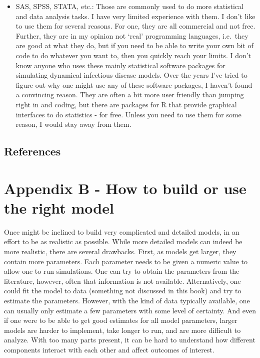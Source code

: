 \documentclass[
]{book}
\begin{document}
\begin{itemize}
\item
  SAS, SPSS, STATA, etc.: Those are commonly used to do more statistical and data analysis tasks. I have very limited experience with them. I don't like to use them for several reasons. For one, they are all commercial and not free. Further, they are in my opinion not `real' programming languages, i.e.~they are good at what they do, but if you need to be able to write your own bit of code to do whatever you want to, then you quickly reach your limits. I don't know anyone who uses these mainly statistical software packages for simulating dynamical infectious disease models. Over the years I've tried to figure out why one might use any of these software packages, I haven't found a convincing reason. They are often a bit more user friendly than jumping right in and coding, but there are packages for R that provide graphical interfaces to do statistics - for free. Unless you need to use them for some reason, I would stay away from them.
\end{itemize}

\hypertarget{references-19}{%
\section{References}\label{references-19}}

\hypertarget{modelcomplexity}{%
\chapter{Appendix B - How to build or use the right model}\label{modelcomplexity}}

Onee might be inclined to build very complicated and detailed models, in an effort to be as realistic as possible. While more detailed models can indeed be more realistic, there are several drawbacks. First, as models get larger, they contain more parameters. Each parameter needs to be given a numeric value to allow one to run simulations. One can try to obtain the parameters from the literature, however, often that information is not available. Alternatively, one could fit the model to data (something not discussed in this book) and try to estimate the parameters. However, with the kind of data typically available, one can usually only estimate a few parameters with some level of certainty. And even if one were to be able to get good estimates for all model parameters, larger models are harder to implement, take longer to run, and are more difficult to analyze. With too many parts present, it can be hard to understand how different components interact with each other and affect outcomes of interest.
\end{document}
